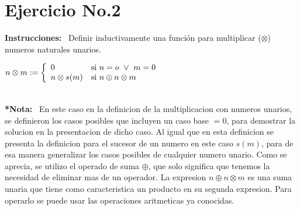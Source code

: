 \documentclass[10pt,a4paper]{article}
\begin{document}
\section*{Ejercicio No.2}
\begin{flushleft}
\textbf{Instrucciones: } \ Definir inductivamente una funci\'on para multiplicar ($\otimes$) numeros naturales unarios.
\end{flushleft}
\begin{center}
$ n\otimes m := \left\{
\begin{array}{l l}
0 & \mbox{si } n=o \ \vee \ m=0 \\ 
 n\otimes s(m) & \mbox{si } n\oplus n\otimes m\\ 
 \end{array}
 \right.$
 
 \
 \\\textbf{*Nota: } \ En este caso en la definicion de la multiplicacion con numeros unarios, se definieron los casos posibles que incluyen un caso base $ = 0 $, para demostrar la solucion en la presentacion de dicho caso. Al igual que en esta definicion se presenta la definicion para el sucesor de un numero en este caso $ s(m) $, para de esa manera generalizar los casos posibles de cualquier numero unario. Como se aprecia, se utilizo el operado de suma $ \oplus $, que solo significa  que tenemos la necesidad de eliminar mas de un operador.  La expresion $n\oplus n\otimes m$ es una suma unaria que tiene como caracteristica un producto en su segunda expresion. Para operarlo se puede usar las operaciones aritmeticas ya conocidas. 
 \end{center}
\end{document}
